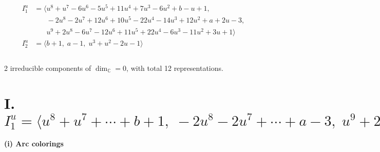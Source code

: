 \documentclass[1p]{elsarticle_modified}
\theoremstyle{definition}
\begin{document}
\begin{align*}
I^u_{1}&=\langle 
u^8+u^7-6 u^6-5 u^5+11 u^4+7 u^3-6 u^2+b- u+1,\\
\phantom{I^u_{1}}&\phantom{= \langle  }-2 u^8-2 u^7+12 u^6+10 u^5-22 u^4-14 u^3+12 u^2+a+2 u-3,\\
\phantom{I^u_{1}}&\phantom{= \langle  }u^9+2 u^8-6 u^7-12 u^6+11 u^5+22 u^4-6 u^3-11 u^2+3 u+1\rangle \\
I^u_{2}&=\langle 
b+1,\;a-1,\;u^3+u^2-2 u-1\rangle \\
\\
\end{align*}
\raggedright * 2 irreducible components of $\dim_{\mathbb{C}}=0$, with total 12 representations.\\
\newpage
\renewcommand{\arraystretch}{1}
\centering \section*{I. $I^u_{1}= \langle u^8+u^7+\cdots+b+1,\;-2 u^8-2 u^7+\cdots+a-3,\;u^9+2 u^8+\cdots+3 u+1 \rangle$}
\flushleft \textbf{(i) Arc colorings}\\
\end{document}
